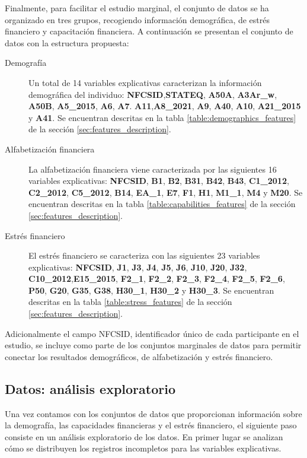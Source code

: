 \documentclass[a4paper, 11pt]{article}
\begin{document}
Finalmente, para facilitar el estudio marginal, el conjunto de datos se ha organizado en tres grupos,
recogiendo información demográfica, de estrés financiero y capacitación financiera. A continuación se
presentan el conjunto de datos con la estructura propuesta:
\begin{description}
    \item[Demografía] Un total de 14 variables explicativas caracterizan la información demográfica 
    del individuo: \textbf{NFCSID},\textbf{STATEQ}, \textbf{A50A}, \textbf{A3Ar\_w}, \textbf{A50B},
    \textbf{A5\_2015}, \textbf{A6}, \textbf{A7}. \textbf{A11},\textbf{A8\_2021}, \textbf{A9}, 
    \textbf{A40}, \textbf{A10}, \textbf{A21\_2015} y \textbf{A41}. Se encuentran descritas en la tabla
    \ref{table:demographics_features} de la sección \ref{sec:features_description}.
    \item[Alfabetización financiera] La alfabetización financiera viene caracterizada por las 
    siguientes 16 variables explicativas: \textbf{NFCSID}, \textbf{B1}, \textbf{B2}, \textbf{B31}, 
    \textbf{B42}, \textbf{B43}, \textbf{C1\_2012}, \textbf{C2\_2012}, \textbf{C5\_2012}, \textbf{B14},
    \textbf{EA\_1}, \textbf{E7}, \textbf{F1}, \textbf{H1}, \textbf{M1\_1}, \textbf{M4} y \textbf{M20}.
    Se encuentran descritas en la tabla \ref{table:capabilities_features} de la sección 
    \ref{sec:features_description}.
    \item[Estrés financiero] El estrés financiero se caracteriza con las siguientes 23 variables 
    explicativas: \textbf{NFCSID}, \textbf{J1}, \textbf{J3}, \textbf{J4}, \textbf{J5}, \textbf{J6}, 
    \textbf{J10}, \textbf{J20}, \textbf{J32}, \textbf{C10\_2012},\textbf{E15\_2015}, \textbf{F2\_1}, 
    \textbf{F2\_2}, \textbf{F2\_3}, \textbf{F2\_4}, \textbf{F2\_5}, \textbf{F2\_6}, \textbf{P50},
    \textbf{G20}, \textbf{G35}, \textbf{G38}, \textbf{H30\_1}, \textbf{H30\_2} y \textbf{H30\_3}.
    Se encuentran descritas en la tabla \ref{table:stress_features} de la sección 
    \ref{sec:features_description}.
\end{description}

Adicionalmente el campo NFCSID, identificador único de cada participante en el estudio, se incluye
como parte de los conjuntos marginales de datos para permitir conectar los resultados demográficos,
de alfabetización y estrés financiero.

\subsection{Datos: análisis exploratorio}
\label{sec:exploratory_analysis}
Una vez contamos con los conjuntos de datos que proporcionan información sobre
la demografía, las capacidades financieras y el estrés financiero, el siguiente
paso consiste en un análisis exploratorio de los datos. En primer lugar se
analizan cómo se distribuyen los registros incompletos para las variables explicativas.
\end{document}
